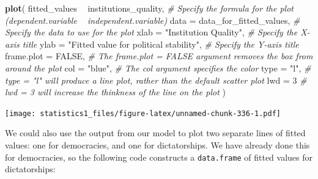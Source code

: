 \documentclass[]{article}
\newenvironment{Shaded}{\begin{snugshade}}{\end{snugshade}}
\newcommand{\KeywordTok}[1]{\textcolor[rgb]{0.13,0.29,0.53}{\textbf{#1}}}
\newcommand{\DataTypeTok}[1]{\textcolor[rgb]{0.13,0.29,0.53}{#1}}
\newcommand{\DecValTok}[1]{\textcolor[rgb]{0.00,0.00,0.81}{#1}}
\newcommand{\StringTok}[1]{\textcolor[rgb]{0.31,0.60,0.02}{#1}}
\newcommand{\CommentTok}[1]{\textcolor[rgb]{0.56,0.35,0.01}{\textit{#1}}}
\newcommand{\OtherTok}[1]{\textcolor[rgb]{0.56,0.35,0.01}{#1}}
\newcommand{\OperatorTok}[1]{\textcolor[rgb]{0.81,0.36,0.00}{\textbf{#1}}}
\newcommand{\NormalTok}[1]{#1}
\theoremstyle{definition}
\theoremstyle{definition}
\theoremstyle{definition}
\theoremstyle{remark}
\begin{document}
\begin{Shaded}
\begin{Highlighting}[]
\KeywordTok{plot}\NormalTok{(}
\NormalTok{  fitted_values }\OperatorTok{~}\StringTok{ }\NormalTok{institutions_quality, }\CommentTok{# Specify the formula for the plot (dependent.variable ~ independent.variable)}
  \DataTypeTok{data =}\NormalTok{ data_for_fitted_values, }\CommentTok{# Specify the data to use for the plot}
  \DataTypeTok{xlab =} \StringTok{"Institution Quality"}\NormalTok{, }\CommentTok{# Specify the X-axis title}
  \DataTypeTok{ylab =} \StringTok{"Fitted value for political stability"}\NormalTok{, }\CommentTok{# Specify the Y-axis title}
  \DataTypeTok{frame.plot =} \OtherTok{FALSE}\NormalTok{, }\CommentTok{# The frame.plot = FALSE argument removes the box from around the plot}
  \DataTypeTok{col =} \StringTok{"blue"}\NormalTok{, }\CommentTok{# The col argument specifies the color}
  \DataTypeTok{type =} \StringTok{"l"}\NormalTok{, }\CommentTok{# type = "l" will produce a line plot, rather than the default scatter plot}
  \DataTypeTok{lwd =} \DecValTok{3} \CommentTok{# lwd = 3 will increase the thinkness of the line on the plot}
\NormalTok{)}
\end{Highlighting}
\end{Shaded}

\texttt{[image: statistics1\_files/figure-latex/unnamed-chunk-336-1.pdf]}

We could also use the output from our model to plot two separate lines
of fitted values: one for democracies, and one for dictatorships. We
have already done this for democracies, so the following code constructs
a \texttt{data.frame} of fitted values for dictatorships:
\end{document}
